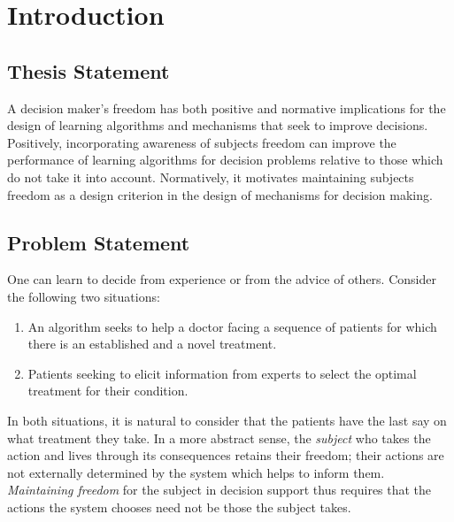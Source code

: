\chapter{Introduction}
\label{cha:intro}



\section{Thesis Statement}
\label{sec:thesisstatement}

A decision maker's freedom has both positive and normative implications for the design of learning algorithms and mechanisms that seek to improve decisions.
Positively, incorporating awareness of subjects freedom can improve the performance of learning algorithms for decision problems relative to those which do not take it into account.
Normatively, it motivates maintaining subjects freedom as a design criterion in the design of mechanisms for decision making.

\section{Problem Statement}
\label{sec:problemstatement}

One can learn to decide from experience or from the advice of others. Consider the following two situations:

\begin{enumerate}
	\item An algorithm seeks to help a doctor facing a sequence of patients for which there is an established and a novel treatment.
	\item Patients seeking to elicit information from experts to select the optimal treatment for their condition.
\end{enumerate}

In both situations, it is natural to consider that the patients have the last say on what treatment they take.
In a more abstract sense, the \emph{subject} who takes the action and lives through its consequences retains their freedom; their actions are not externally determined by the system which helps to inform them.
\emph{Maintaining freedom} for the subject in decision support thus requires that the actions the system chooses need not be those the subject takes.

